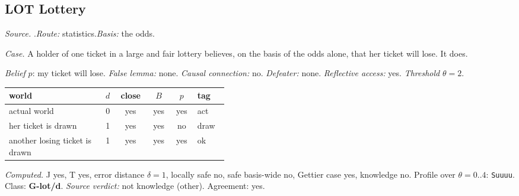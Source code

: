 \subsection*{LOT \enspace Lottery}
\noindent\textit{Source.} \citet{Hawthorne2004}.\quad \textit{Route:} statistics.\quad \textit{Basis:} the odds.\par
\noindent\textit{Case.} A holder of one ticket in a large and fair lottery believes, on the basis of the odds alone, that her ticket will lose. It does.\par
\noindent\textit{Belief} $p$: my ticket will lose.
 \textit{False lemma:} none. \textit{Causal connection:} no. \textit{Defeater:} none. \textit{Reflective access:} yes. \textit{Threshold} $\theta = 2$.\par
\begin{center}\begin{tabular}{@{}p{0.43\linewidth}rcccl@{}}
world & $d$ & close & $B$ & $p$ & tag \\ \midrule
actual world & 0 & yes & yes & yes & act \\
her ticket is drawn & 1 & yes & yes & no & draw \\
another losing ticket is drawn & 1 & yes & yes & yes & ok \\
\end{tabular}\end{center}
\noindent\textit{Computed.} J yes, T yes, error distance $\delta = 1$, locally safe no, safe basis-wide no, Gettier case yes, knowledge no. Profile over $\theta = 0..4$: \texttt{Suuuu}. Class: \textbf{G-lot/d}.
 \textit{Source verdict:} not knowledge (other). Agreement: yes.
\par\medskip
{}
